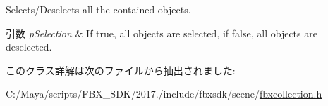 Selects/\+Deselects all the contained objects. 
\begin{DoxyParams}{引数}
{\em p\+Selection} & If {\ttfamily true}, all objects are selected, if {\ttfamily false}, all objects are deselected. \\
\hline
\end{DoxyParams}


このクラス詳解は次のファイルから抽出されました\+:\begin{DoxyCompactItemize}
\item 
C\+:/\+Maya/scripts/\+F\+B\+X\+\_\+\+S\+D\+K/2017./include/fbxsdk/scene/\hyperlink{fbxcollection_8h}{fbxcollection.\+h}\end{DoxyCompactItemize}
